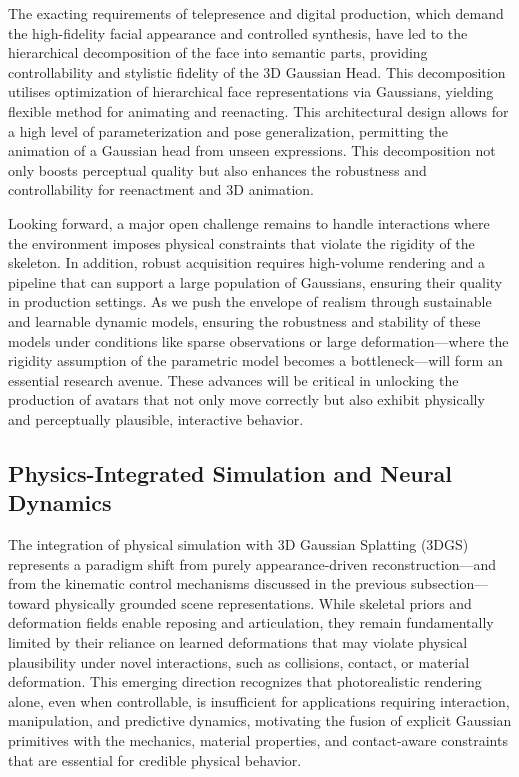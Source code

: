 \documentclass[11pt,a4paper]{article}
\begin{document}
The exacting requirements of telepresence and digital production, which demand the high-fidelity facial appearance and controlled synthesis, have led to the hierarchical decomposition of the face into semantic parts, providing controllability and stylistic fidelity of the 3D Gaussian Head. This decomposition utilises optimization of hierarchical face representations via Gaussians, yielding flexible method for animating and reenacting. This architectural design allows for a high level of parameterization and pose generalization, permitting the animation of a Gaussian head from unseen expressions. This decomposition not only boosts perceptual quality but also enhances the robustness and controllability for reenactment and 3D animation.

Looking forward, a major open challenge remains to handle interactions where the environment imposes physical constraints that violate the rigidity of the skeleton. In addition, robust acquisition requires high-volume rendering and a pipeline that can support a large population of Gaussians, ensuring their quality in production settings. As we push the envelope of realism through sustainable and learnable dynamic models, ensuring the robustness and stability of these models under conditions like sparse observations or large deformation---where the rigidity assumption of the parametric model becomes a bottleneck---will form an essential research avenue. These advances will be critical in unlocking the production of avatars that not only move correctly but also exhibit physically and perceptually plausible, interactive behavior.


\subsection{Physics-Integrated Simulation and Neural Dynamics}


The integration of physical simulation with 3D Gaussian Splatting (3DGS) represents a paradigm shift from purely appearance-driven reconstruction---and from the kinematic control mechanisms discussed in the previous subsection---toward physically grounded scene representations. While skeletal priors and deformation fields enable reposing and articulation, they remain fundamentally limited by their reliance on learned deformations that may violate physical plausibility under novel interactions, such as collisions, contact, or material deformation. This emerging direction recognizes that photorealistic rendering alone, even when controllable, is insufficient for applications requiring interaction, manipulation, and predictive dynamics, motivating the fusion of explicit Gaussian primitives with the mechanics, material properties, and contact-aware constraints that are essential for credible physical behavior.
\end{document}
